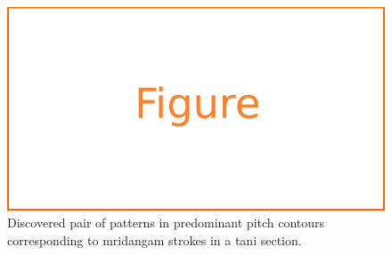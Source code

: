 {\begin{figure}
	\begin{center}
		\includegraphics[width=\figSizeNinety]{ch05_preprocessing/figures/figure_todo.pdf}
	\end{center}
	\caption{Discovered pair of patterns in predominant pitch contours corresponding to \gls{mridangam} strokes in a \gls{tani} section.}
	\label{fig:pitch_pattern_tani}
\end{figure}

}
